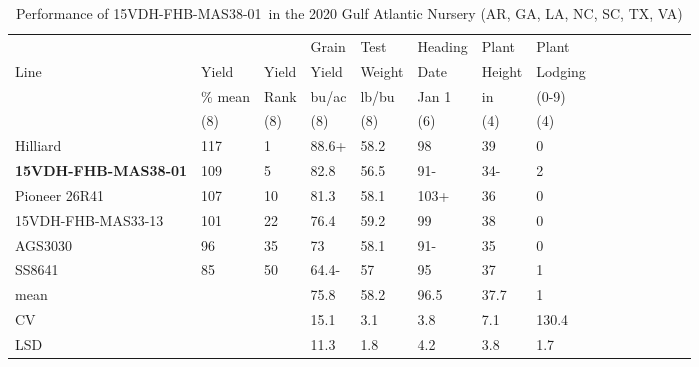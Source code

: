 \documentclass[12pt, letterpaper]{article}
\newcommand{\lin}{15VDH-FHB-MAS38-01~}
\begin{document}
\begin{landscape}
\begin{table}[ht]
\caption{Performance of \lin in the 2020 Gulf Atlantic Nursery (AR, GA, LA, NC, SC, TX, VA)}
\label{gawn}
\begin{tabular}{lllllllllllllll}
  \hline
     &         &       & Grain & Test   & Heading & Plant  & Plant   \\
Line & Yield   & Yield & Yield & Weight & Date    & Height & Lodging \\
     & \% mean & Rank  & bu/ac & lb/bu  & Jan 1   & in     & (0-9)   \\
     & (8)     & (8)   & (8)   & (8)    & (6)     & (4)    & (4)     \\
  \hline
  Hilliard           & 117 &  1   & 88.6+ & 58.2 & 98   & 39   & 0     \\
  \textbf{15VDH-FHB-MAS38-01} & 109 &  5   & 82.8  & 56.5 & 91-  & 34-  & 2     \\    
  Pioneer 26R41      & 107 & 10   & 81.3  & 58.1 & 103+ & 36   & 0     \\    
  15VDH-FHB-MAS33-13 & 101 & 22   & 76.4  & 59.2 & 99   & 38   & 0     \\    
  AGS3030            &  96 & 35   & 73    & 58.1 & 91-  & 35   & 0     \\    
  SS8641             &  85 & 50   & 64.4- & 57   & 95   & 37   & 1     \\    
  mean               &     &      & 75.8  & 58.2 & 96.5 & 37.7 & 1     \\  
  CV                 &     &      & 15.1  & 3.1  & 3.8  & 7.1  & 130.4 \\
  LSD                &     &      & 11.3  & 1.8  & 4.2  & 3.8  & 1.7   \\
   \hline
\end{tabular}

\bigskip


\end{table}
\end{landscape}
\end{document}

